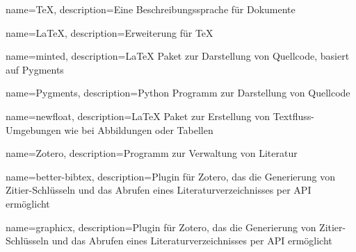 \makeglossaries %

{
        name=TeX,
        description={Eine Beschreibungssprache für Dokumente}
}

{
        name=LaTeX,
        description={Erweiterung für TeX}
}

{
        name=minted,
        description={LaTeX Paket zur Darstellung von Quellcode, basiert auf Pygments}
}

{
        name=Pygments,
        description={Python Programm zur Darstellung von Quellcode}
}

{
        name=newfloat,
        description={LaTeX Paket zur Erstellung von Textfluss-Umgebungen wie bei Abbildungen oder Tabellen}
}

{
        name=Zotero,
        description={Programm zur Verwaltung von Literatur}
}

{
        name=better-bibtex,
        description={Plugin für Zotero, das die Generierung von Zitier-Schlüsseln und das Abrufen eines Literaturverzeichnisses per API ermöglicht}
}

{
        name=graphicx,
        description={Plugin für Zotero, das die Generierung von Zitier-Schlüsseln und das Abrufen eines Literaturverzeichnisses per API ermöglicht}
}




